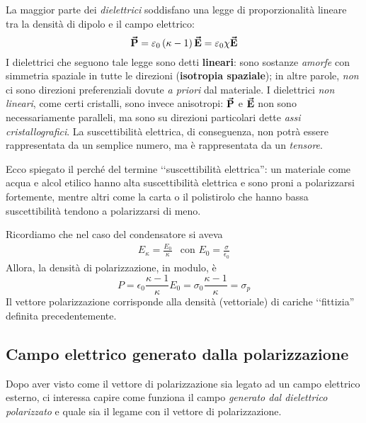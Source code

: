 La maggior parte dei \textit{dielettrici} soddisfano una legge di proporzionalità lineare tra la densità di dipolo e il campo elettrico:
\begin{equation}
	\vb*{\va{P}}=\varepsilon_0\left(\kappa-1\right)\vb*{\va{E}}=\varepsilon_0\chi\vb*{\va{E}}
\end{equation}
I dielettrici che seguono tale legge sono detti \textbf{lineari}: sono sostanze \textit{amorfe} con simmetria spaziale in tutte le direzioni (\textbf{isotropia spaziale}); in altre parole, \textit{non} ci sono direzioni preferenziali dovute \textit{a priori} dal materiale. I dielettrici \textit{non lineari}, come certi cristalli, sono invece anisotropi: $\vb*{\va{P}}$ e $\vb*{\va{E}}$ non sono necessariamente paralleli, ma sono su direzioni particolari dette \textit{assi cristallografici}. La suscettibilità elettrica, di conseguenza, non potrà essere rappresentata da un semplice numero, ma è rappresentata da un \textit{tensore}.
\begin{observe}
	Ecco spiegato il perché del termine ‘‘suscettibilità elettrica'': un materiale come acqua e alcol etilico hanno alta suscettibilità elettrica e sono proni a polarizzarsi fortemente, mentre altri come la carta o il polistirolo che hanno bassa suscettibilità tendono a polarizzarsi di meno. %
\end{observe}
\begin{example}
	Ricordiamo che nel caso del condensatore si aveva
	\begin{align*}
		E_{\kappa}=\frac{E_0}{\kappa}&\text{con } E_0=\frac{\sigma}{\epsilon_0 }
	\end{align*}
	Allora, la densità di polarizzazione, in modulo, è
	\begin{equation}
		P=\epsilon_0\frac{\kappa-1}{\kappa}E_0=\sigma_0\frac{\kappa-1}{\kappa}=\sigma_p
	\end{equation}
Il vettore polarizzazione corrisponde alla densità (vettoriale) di cariche ‘‘fittizia'' definita precedentemente.
\end{example}
\subsection{Campo elettrico generato dalla polarizzazione}
Dopo aver visto come il vettore di polarizzazione sia legato ad un campo elettrico esterno, ci interessa capire come funziona il campo \textit{generato dal dielettrico polarizzato} e quale sia il legame con il vettore di polarizzazione.

